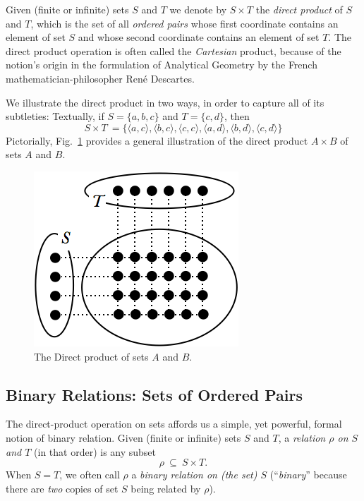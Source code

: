 Given (finite or infinite) sets $S$ and $T$ we denote by $S \times T$
 the {\it direct product} of $S$ and $T$,
 which is the set of all {\it ordered
  pairs}  whose first coordinate
contains an element of set $S$ and whose second coordinate contains an
element of set $T$.  The direct product operation is often called the
{\it Cartesian} product,  because of
the notion's origin in the formulation of Analytical Geometry by the
French mathematician-philosopher Ren\'{e} Descartes. 

We illustrate the direct product in two ways, in order to capture all
of its subtleties: Textually, if $S = \{a,b,c\}$ and $T = \{c,d\}$,
then
\[ S \times T \ =  \{
\langle a,c \rangle,
\langle b,c \rangle,
\langle c,c \rangle,
\langle a,d \rangle,
\langle b,d \rangle,
\langle c,d \rangle\}
\]
Pictorially,
Fig.~\ref{fig:cartesianproduct} provides a general illustration of
the direct product $A \times B$ of sets $A$ and $B$.
\begin{figure}[htb]
\begin{center}
        \includegraphics[scale=0.4]{FiguresMaths/cartesianProduct}
        \caption{The Direct product of sets $A$ and $B$.}
        \label{fig:cartesianproduct}
\end{center}
\end{figure}

\subsection{Binary Relations: Sets of Ordered Pairs}
\label{sec:relation}

The direct-product operation on sets affords us a simple, yet
powerful, formal notion of binary relation.  Given (finite or
infinite) sets $S$ and $T$, a {\it relation $\rho$ on $S$ and
  $T$} (in that order) is any subset
\[ \rho \ \subseteq \ S \times T. \]
When $S = T$, we often call $\rho$ a {\em binary relation on (the set)
  $S$} (``{\em binary}'' because there
are {\em two} copies of set $S$ being related by $\rho$).

